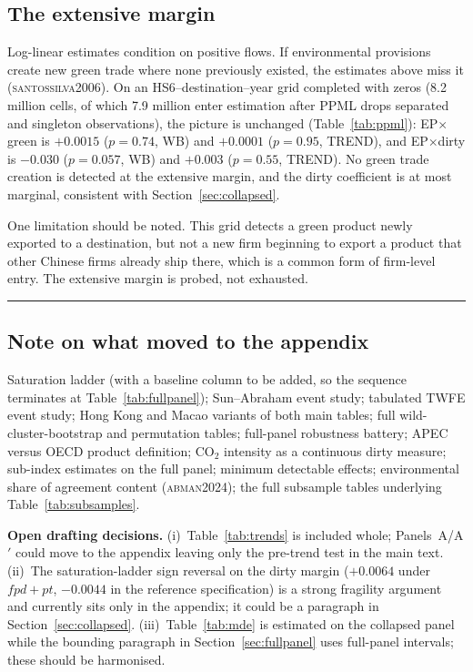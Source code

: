 \documentclass[11pt]{article}
\newcommand{\citep}[1]{(\textsc{#1})}
\begin{document}
\FloatBarrier
\subsection{The extensive margin}\label{sec:ppml}

Log-linear estimates condition on positive flows. If environmental provisions create new green trade
where none previously existed, the estimates above miss it \citep{santossilva2006}. On an
HS6--destination--year grid completed with zeros (8.2 million cells, of which 7.9 million enter
estimation after PPML drops separated and singleton observations), the picture is unchanged
(Table~\ref{tab:ppml}): EP$\times$green is $+0.0015$ ($p = 0.74$, WB) and $+0.0001$ ($p = 0.95$,
TREND), and EP$\times$dirty is $-0.030$ ($p = 0.057$, WB) and $+0.003$ ($p = 0.55$, TREND). No green
trade creation is detected at the extensive margin, and the dirty coefficient is at most marginal,
consistent with Section~\ref{sec:collapsed}.

One limitation should be noted. This grid detects a green product newly exported to a destination,
but not a new firm beginning to export a product that other Chinese firms already ship there, which
is a common form of firm-level entry. The extensive margin is probed, not exhausted.



\FloatBarrier
\vspace{18pt}
\noindent\rule{\textwidth}{0.4pt}
\subsection*{Note on what moved to the appendix}
\footnotesize
Saturation ladder (with a baseline column to be added, so the sequence terminates at
Table~\ref{tab:fullpanel}); Sun--Abraham event study; tabulated TWFE event study; Hong Kong and
Macao variants of both main tables; full wild-cluster-bootstrap and permutation tables; full-panel
robustness battery; APEC versus OECD product definition; CO$_2$ intensity as a continuous dirty
measure; sub-index estimates on the full panel; minimum detectable effects; environmental share of
agreement content \citep{abman2024}; the full subsample tables underlying
Table~\ref{tab:subsamples}.

\bigskip
\noindent\textbf{Open drafting decisions.}
(i)~Table~\ref{tab:trends} is included whole; Panels~A/A$'$ could move to the appendix leaving only
the pre-trend test in the main text. (ii)~The saturation-ladder sign reversal on the dirty margin
($+0.0064$ under $fpd + pt$, $-0.0044$ in the reference specification) is a strong fragility
argument and currently sits only in the appendix; it could be a paragraph in
Section~\ref{sec:collapsed}. (iii)~Table~\ref{tab:mde} is estimated on the collapsed panel while the
bounding paragraph in Section~\ref{sec:fullpanel} uses full-panel intervals; these should be
harmonised.
\normalsize
\end{document}
